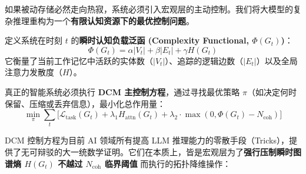 
如果被动存储必然走向热寂，系统必须引入宏观层的主动控制。我们将大模型的复杂推理重构为一个\textbf{有限认知资源下的最优控制问题}。

定义系统在时刻 $t$ 的\textbf{瞬时认知负载泛函 (Complexity Functional, $\Phi(G_t)$)}：
\begin{equation}
    \Phi(G_t) = \alpha |V_t| + \beta |E_t| + \gamma H(G_t)
\end{equation}
它衡量了当前工作记忆中活跃的实体数（$|V_t|$）、追踪的逻辑边数（$|E_t|$）以及全局注意力发散度（$H$）。

真正的智能系统必须执行 \textbf{DCM 主控制方程}，通过寻找最优策略 $\pi$（如决定何时保留、压缩或丢弃信息），最小化总作用量：
\begin{equation}
    \boxed{ \min_{\pi} \sum_t \Big[ \mathcal{L}_{\text{task}}(G_t) + \lambda_1 H_{\text{attn}}(G_t) + \lambda_2 \cdot \max(0, \Phi(G_t) - N_{\text{coh}}) \Big] }
\end{equation}


DCM 控制方程为目前 AI 领域所有提高 LLM 推理能力的零散手段（Tricks），提供了无可辩驳的大一统数学证明。它们在本质上，皆是宏观层为了\textbf{强行压制瞬时图谱熵 $H(G_t)$ 不越过 $N_{\text{coh}}$ 临界阈值} 而执行的拓扑降维操作：

